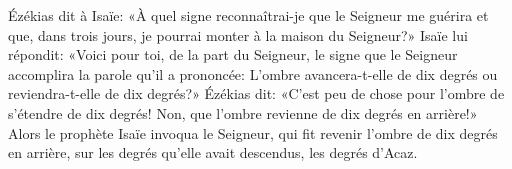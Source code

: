 Ézékias dit à Isaïe: «À quel signe reconnaîtrai-je que le Seigneur me guérira
	et que, dans trois jours, je pourrai monter à la maison du Seigneur?»
Isaïe lui répondit: «Voici pour toi, de la part du Seigneur,
	le signe que le Seigneur accomplira la parole qu’il a prononcée:
	L’ombre avancera-t-elle de dix degrés ou reviendra-t-elle de dix degrés?»
Ézékias dit: «C’est peu de chose pour l’ombre de s’étendre de dix degrés!
	Non, que l’ombre revienne de dix degrés en arrière!»
Alors le prophète Isaïe invoqua le Seigneur,
	qui fit revenir l’ombre de dix degrés en arrière,
	sur les degrés qu’elle avait descendus, les degrés d’Acaz.
